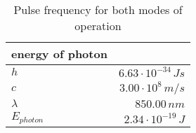 \begin{table}[H]
\centering
\caption{Pulse frequency for both modes of operation}
\label{tab:energy_of_photon}
\begin{tabular}{|l|r|}\hline
    \textbf{energy of photon} & \\
    \hline 
    $h$ & $6.63\cdot10^{-34}\,Js$ \\
    $c$ & $3.00\cdot10^{8}\,m/s$ \\
    $\lambda$ & $850.00\,n m$ \\
    $E_{photon}$ & $2.34\cdot10^{-19}\,J$ \\
    \hline 
\end{tabular}
\end{table}
